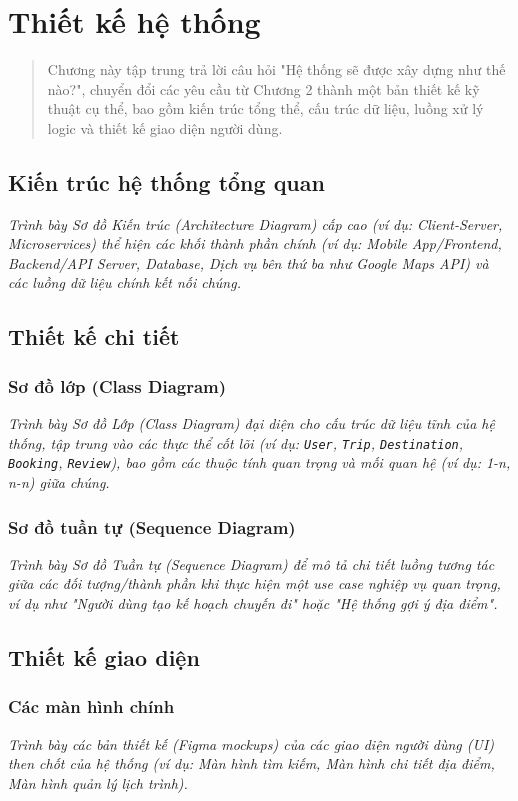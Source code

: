 \chapter{Thiết kế hệ thống}

\begin{quote}
\itshape

Chương này tập trung trả lời câu hỏi "Hệ thống sẽ được xây dựng như thế nào?", chuyển đổi các yêu cầu từ Chương 2 thành một bản thiết kế kỹ thuật cụ thể, bao gồm kiến trúc tổng thể, cấu trúc dữ liệu, luồng xử lý logic và thiết kế giao diện người dùng.
\end{quote}

\section{Kiến trúc hệ thống tổng quan}

{\itshape
Trình bày Sơ đồ Kiến trúc (Architecture Diagram) cấp cao (ví dụ: Client-Server, Microservices) thể hiện các khối thành phần chính (ví dụ: Mobile App/Frontend, Backend/API Server, Database, Dịch vụ bên thứ ba như Google Maps API) và các luồng dữ liệu chính kết nối chúng.
}

\section{Thiết kế chi tiết}

\subsection{Sơ đồ lớp (Class Diagram)}

{\itshape
Trình bày Sơ đồ Lớp (Class Diagram) đại diện cho cấu trúc dữ liệu tĩnh của hệ thống, tập trung vào các thực thể cốt lõi (ví dụ: \texttt{User}, \texttt{Trip}, \texttt{Destination}, \texttt{Booking}, \texttt{Review}), bao gồm các thuộc tính quan trọng và mối quan hệ (ví dụ: 1-n, n-n) giữa chúng.
}

\subsection{Sơ đồ tuần tự (Sequence Diagram)}

{\itshape
Trình bày Sơ đồ Tuần tự (Sequence Diagram) để mô tả chi tiết luồng tương tác giữa các đối tượng/thành phần khi thực hiện một use case nghiệp vụ quan trọng, ví dụ như "Người dùng tạo kế hoạch chuyến đi" hoặc "Hệ thống gợi ý địa điểm".
}

\pagebreak

\section{Thiết kế giao diện}

\subsection{Các màn hình chính}

{\itshape
Trình bày các bản thiết kế (Figma mockups) của các giao diện người dùng (UI) then chốt của hệ thống (ví dụ: Màn hình tìm kiếm, Màn hình chi tiết địa điểm, Màn hình quản lý lịch trình).
}
